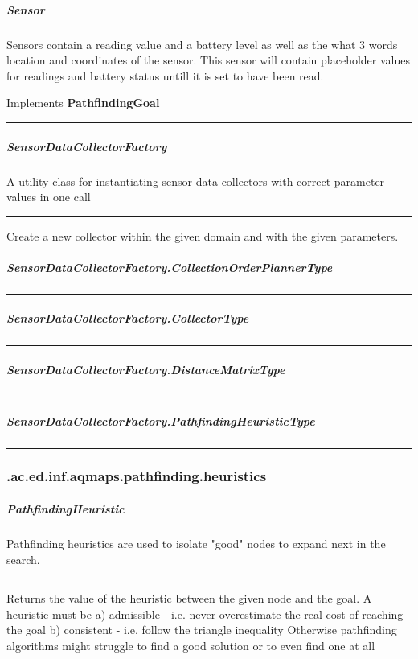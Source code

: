 \subparagraph{ Sensor } Sensors contain a reading value and a battery level as well as the what 3 words location and coordinates of the sensor.
 This sensor will contain placeholder values for readings and battery status untill it is set to have been read.
 
Implements \textbf{ PathfindingGoal }
\hrule
\begin{mitem}
\scriptsize
	{}
	{}
\end{mitem}

\subparagraph{ SensorDataCollectorFactory } A utility class for instantiating sensor data collectors with correct parameter values in one call
 
\hrule
\begin{mitem}
\scriptsize
	{}
	{Create a new collector within the given domain and with the given parameters.}
\end{mitem}

\subparagraph{ SensorDataCollectorFactory.CollectionOrderPlannerType } 
 
\hrule

\subparagraph{ SensorDataCollectorFactory.CollectorType } 
 
\hrule

\subparagraph{ SensorDataCollectorFactory.DistanceMatrixType } 
 
\hrule

\subparagraph{ SensorDataCollectorFactory.PathfindingHeuristicType } 
 
\hrule

\subsubsection{ .ac.ed.inf.aqmaps.pathfinding.heuristics }
\subparagraph{ PathfindingHeuristic } Pathfinding heuristics are used to isolate "good" nodes to expand next in the search.
 
\hrule
\begin{mitem}
\scriptsize
	{Returns the value of the heuristic between the given node and the goal. A heuristic must be \newline%
 a) admissible {-} i.e. never overestimate the real cost of reaching the goal\newline%
 b) consistent {-} i.e. follow the triangle inequality\newline%
 Otherwise pathfinding algorithms might struggle to find a good solution or to even find one at all}
\end{mitem}

